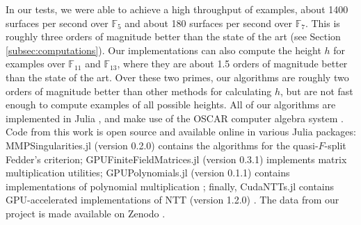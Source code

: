 In our tests, we were able to achieve a high throughput of examples,
about 1400 surfaces per second over \(\mathbb{F}_{5}\) and
about 180 surfaces per second over \(\mathbb{F}_{7}\).
This is roughly three orders of magnitude better than the state of the art
(see Section \ref{subsec:computations}).
Our implementations can also compute the height \(h\) for examples
over
\(\mathbb{F}_{11}\) and \(\mathbb{F}_{13}\),
where they are about 1.5 orders of magnitude better than the state of the art.
Over these two primes, our algorithms are roughly two orders of magnitude
better than other methods for calculating \(h\),
but are not fast enough to compute examples of all possible heights.
All of our algorithms are implemented in Julia 
\cite{julia-2017}, and
make use of the OSCAR computer algebra system 
\cite{OSCAR-book}.
Code from this work is open source and available online 
in various
Julia packages: 
MMPSingularities.jl (version 0.2.0) \cite{mmpsingularities-jl} contains the algorithms
for the quasi-\(F\)-split Fedder's criterion;
GPUFiniteFieldMatrices.jl (version 0.3.1) \cite{gpuffmatrices-jl}
implements matrix multiplication utilities;
GPUPolynomials.jl (version 0.1.1) contains implementations of polynomial multiplication
\cite{gpupolynomials-jl};
finally, CudaNTTs.jl contains GPU-accelerated implementations of NTT (version 1.2.0) \cite{cudantts-jl}.
The data from our project is made available on Zenodo
\cite{garzella-2025-k3-data}.



